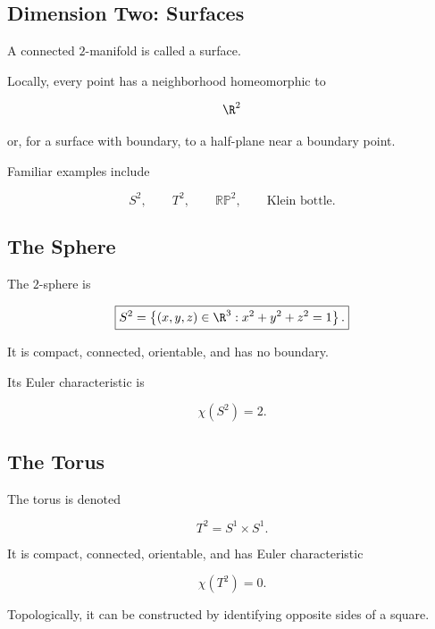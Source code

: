 \subsection{Dimension Two: Surfaces}
\label{subsec:dimension-two-surfaces}

A connected \(2\)-manifold is called a surface.

Locally, every point has a neighborhood homeomorphic to

\[
\R^2
\]

or, for a surface with boundary, to a half-plane near a boundary point.

Familiar examples include

\[
S^2,
\qquad
T^2,
\qquad
\mathbb{RP}^2,
\qquad
\text{Klein bottle}.
\]

\subsection{The Sphere}
\label{subsec:low-dimensional-sphere}

The \(2\)-sphere is

\[
\boxed{
S^2
=
\left\{
(x,y,z)\in\R^3:
x^2+y^2+z^2=1
\right\}.
}
\]

It is compact, connected, orientable, and has no boundary.

Its Euler characteristic is

\[
\boxed{
\chi(S^2)=2.
}
\]

\subsection{The Torus}
\label{subsec:low-dimensional-torus}

The torus is denoted

\[
\boxed{
T^2=S^1\times S^1.
}
\]

It is compact, connected, orientable, and has Euler characteristic

\[
\boxed{
\chi(T^2)=0.
}
\]

Topologically, it can be constructed by identifying opposite sides of a
square.

